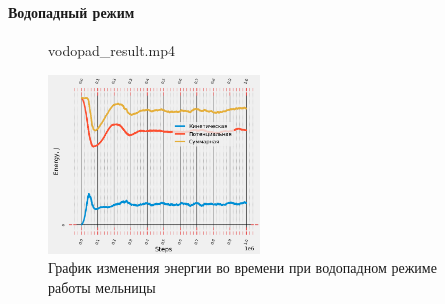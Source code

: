 \documentclass[c]{beamer}  %
\begin{document}
\begin{frame}
\frametitle{\insertsection} 
\framesubtitle{Водопадный режим}

\begin{figure}[ht]
     		{vodopad_result.mp4}
\end{figure}
\begin{figure}[H]
	\centering
	\includegraphics[width=0.5\textwidth]{vodopad_energy} 
	\caption{График изменения энергии во времени при водопадном режиме работы мельницы}
	\label{pic:vodopad_energy}
\end{figure} 
\end{frame}
\end{document}
